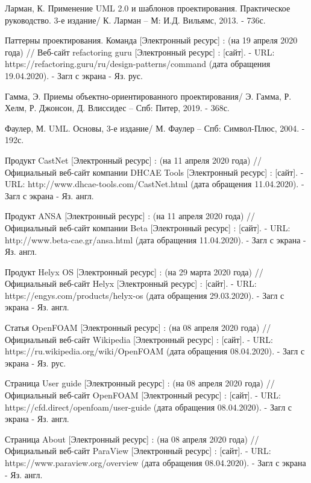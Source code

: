 \documentclass[14pt]{extreport}
\begin{document}
\begin{thebibliography}{9}
  Ларман, К. Применение UML 2.0 и шаблонов проектирования. Практическое руководство. 3-е издание/ К. Ларман -- М: И.Д. Вильямс, 2013. - 736с.

  Паттерны проектирования. Команда [Электронный ресурс] : (на 19 апреля 2020 года) // Веб-сайт refactoring guru [Электронный ресурс] : [сайт]. - URL: https://refactoring.guru/ru/design-patterns/command (дата обращения 19.04.2020). - Загл с экрана - Яз. рус.

  Гамма, Э. Приемы объектно-ориентированного проектирования/ Э. Гамма, Р. Хелм, Р. Джонсон, Д. Влиссидес -- Спб: Питер, 2019. - 368с.
  
  Фаулер, М. UML. Основы, 3-е издание/ М. Фаулер -- Спб: Символ-Плюс, 2004. - 192с.

   Продукт CastNet [Электронный ресурс] : (на 11 апреля 2020 года) // Официальный веб-сайт компании DHCAE Tools [Электронный ресурс] : [сайт]. - URL: http://www.dhcae-tools.com/CastNet.html (дата обращения 11.04.2020). - Загл с экрана - Яз. англ.

   Продукт ANSA [Электронный ресурс] : (на 11 апреля 2020 года) // Официальный веб-сайт компании Beta [Электронный ресурс] : [сайт]. - URL: http://www.beta-cae.gr/ansa.html (дата обращения 11.04.2020). - Загл с экрана - Яз. англ.
   
   Продукт Helyx OS [Электронный ресурс] : (на 29 марта 2020 года) // Официальный веб-сайт Helyx [Электронный ресурс] : [сайт]. - URL: https://engys.com/products/helyx-os (дата обращения 29.03.2020). - Загл с экрана - Яз. англ.

   Статья OpenFOAM [Электронный ресурс] : (на 08 апреля 2020 года) // Официальный веб-сайт Wikipedia [Электронный ресурс] : [сайт]. - URL: https://ru.wikipedia.org/wiki/OpenFOAM (дата обращения 08.04.2020). - Загл с экрана - Яз. рус.
   
   Страница User guide [Электронный ресурс] : (на 08 апреля 2020 года) // Официальный веб-сайт OpenFOAM [Электронный ресурс] : [сайт]. - URL: https://cfd.direct/openfoam/user-guide (дата обращения 08.04.2020). - Загл с экрана - Яз. англ.


   Страница About [Электронный ресурс] : (на 08 апреля 2020 года) // Официальный веб-сайт ParaView [Электронный ресурс] : [сайт]. - URL: https://www.paraview.org/overview (дата обращения 08.04.2020). - Загл с экрана - Яз. англ.
   

\end{thebibliography}
\end{document}
